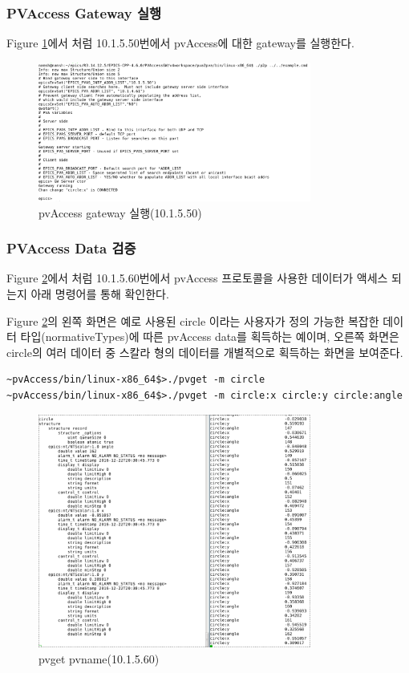 \documentclass[11pt
  , a4paper
  , article
  , oneside
]{memoir}
\begin{document}
\clearpage


\subsubsection{PVAccess Gateway 실행}
Figure \ref{fig:gw_start}에서 처럼 10.1.5.50번에서 pvAccess에 대한 gateway를 실행한다. 

\begin{figure}[!htb]
	\centering
	\includegraphics[width=0.8\textwidth, height=0.5\textheight]{./images/GW_start.png}
	\caption{
		pvAccess gateway 실행(10.1.5.50)
	}		
	\label{fig:gw_start}   
\end{figure}
\clearpage


\subsubsection{PVAccess Data 검증}
Figure \ref{fig:pvget}에서 처럼 10.1.5.60번에서 pvAccess 프로토콜을 사용한 데이터가 액세스 되는지 아래 명령어를 통해 확인한다.

Figure \ref{fig:pvget}의 왼쪽 화면은 예로 사용된 circle 이라는 사용자가 정의 가능한 복잡한 데이터 타입(normativeTypes)에 따른 pvAccess data를 획득하는 예이며, 오른쪽 화면은 circle의 여러 데이터 중 스칼라 형의 데이터를 개별적으로 획득하는 화면을 보여준다.


\begin{lstlisting}[style=termstyle]
~pvAccess/bin/linux-x86_64$>./pvget -m circle
~pvAccess/bin/linux-x86_64$>./pvget -m circle:x circle:y circle:angle
\end{lstlisting} 

\begin{figure}[!htb]
	\centering
	\includegraphics[width=0.8\textwidth, height=0.5\textheight]{./images/pvget_result.png}
	\caption{
		pvget pvname(10.1.5.60)
	}		
	\label{fig:pvget}   
\end{figure}
\end{document}
